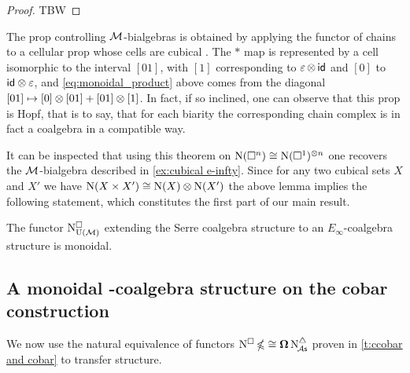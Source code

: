 \begin{proof}
	TBW
\end{proof}

\begin{remark}
	The prop controlling $\mathcal{M}$-bialgebras is obtained by applying the functor of chains to a cellular prop whose cells are cubical \cite{medina2021prop2}.
	The $\ast$ map is represented by a cell isomorphic to the interval $[01]$, with $[1]$ corresponding to $\operatorname{\varepsilon} \otimes \, \mathsf{id}$ and $[0]$ to $\mathsf{id} \otimes \operatorname{\varepsilon}$, and \cref{eq:monoidal_product} above comes from the diagonal $[01] \mapsto [0] \otimes [01] + [01] \otimes [1]$.
	In fact, if so inclined, one can observe that this prop is Hopf, that is to say, that for each biarity the corresponding chain complex is in fact a coalgebra in a compatible way.
\end{remark}

It can be inspected that using this theorem on $\operatorname{N}(\square^n) \cong \operatorname{N}(\square^1)^{\otimes n}$ one recovers the $\mathcal{M}$-bialgebra described in \cref{ex:cubical e-infty}.
Since for any two cubical sets $X$ and $X'$ we have $\operatorname{N}(X \times X') \cong \operatorname{N}(X) \otimes \operatorname{N}(X')$ the above lemma implies the following statement, which constitutes the first part of our main result.

\begin{theorem}\label{t:cubical e-infty chains are monoidal}
	The functor $\operatorname{N^{\square}_{{\operatorname{U}(\mathcal{M})}}}$ extending the Serre coalgebra structure to an $E_\infty$-coalgebra structure is monoidal.
\end{theorem}

\subsection{A monoidal \pdfEinfty-coalgebra structure on the cobar construction}\label{ss:e-infty on cobar}


We now use the natural equivalence of functors $\operatorname{N^{\square}} \operatorname{\mathbb{\Omega}} \cong \operatorname{\mathbf{\Omega}} \operatorname{N^{\triangle}_{\!{\mathcal{A}\mathsf{s}}}}$ proven in \cref{t:ccobar and cobar} to transfer structure.


